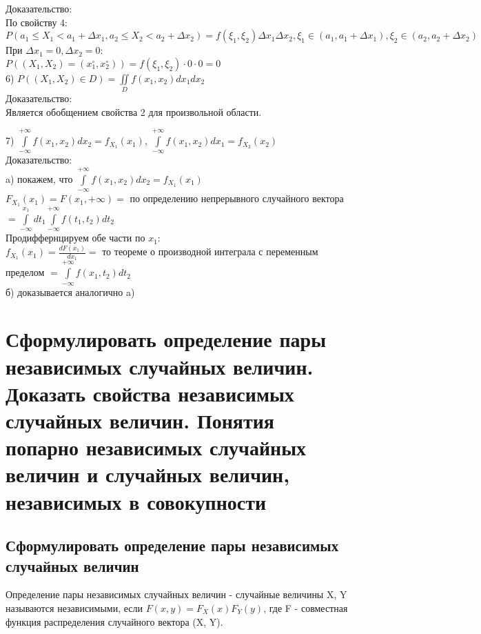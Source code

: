 Доказательство:\\
По свойству 4:\\
$P(a_{1} \leqslant X_{1} < a_{1} + \Delta x_{1}, a_{2} \leqslant X_{2} < a_{2} + \Delta x_{2}) =  f(\xi_{1}, \xi_{2}) \Delta x_{1} \Delta x_{2}, \xi_{1} \in (a_{1}, a_{1} + \Delta x_{1}), \xi_{2} \in (a_{2}, a_{2} + \Delta x_{2})$\\
При $\Delta x_{1} = 0, \Delta x_{2} = 0$:\\
$P((X_{1}, X_{2}) = (x_{1}^{\circ}, x_{2}^{\circ})) = f(\xi_{1}, \xi_{2}) \cdot 0 \cdot 0 = 0$\\

6) $P((X_{1}, X_{2}) \in D) = \iint\limits_{D} f(x_{1}, x_{2}) dx_{1} dx_{2}$\\

Доказательство:\\
Является обобщением свойства 2 для произвольной области.

7) $\int\limits_{-\infty}^{+\infty} f(x_{1}, x_{2}) dx_{2} = f_{X_{1}}(x_{1})$, $\int\limits_{-\infty}^{+\infty} f(x_{1}, x_{2}) dx_{1} = f_{X_{2}}(x_{2})$\\

Доказательство:\\
a) покажем, что $\int\limits_{-\infty}^{+\infty} f(x_{1}, x_{2}) dx_{2} = f_{X_{1}}(x_{1})$\\
$F_{X_{1}}(x_{1}) = F(x_{1}, +\infty) = $ по определению непрерывного случайного вектора $ = \int\limits^{x_{1}}_{-\infty} dt_{1} \int\limits^{+\infty}_{-\infty} f(t_{1}, t_{2}) dt_{2}$\\

Продиффернцируем обе части по $x_{1}$:\\
$f_{X_{1}}(x_{1}) = \frac{dF(x_{1})}{dx_{1}} = $ то теореме о производной интеграла с переменным пределом $ = \int\limits^{+\infty}_{-\infty} f(x_{1}, t_{2}) dt_{2}$\\
б) доказывается аналогично a)\\

\section{Сформулировать определение пары независимых случайных величин. Доказать свойства независимых случайных величин. Понятия попарно независимых случайных величин и случайных величин, независимых в совокупности}

\subsection{Сформулировать определение пары независимых случайных величин}
Определение пары независимых случайных величин - случайные величины X, Y называются независимыми, если $F(x, y) = F_{X}(x)F_{Y}(y)$, где F - совместная функция распределения случайного вектора (X, Y).

